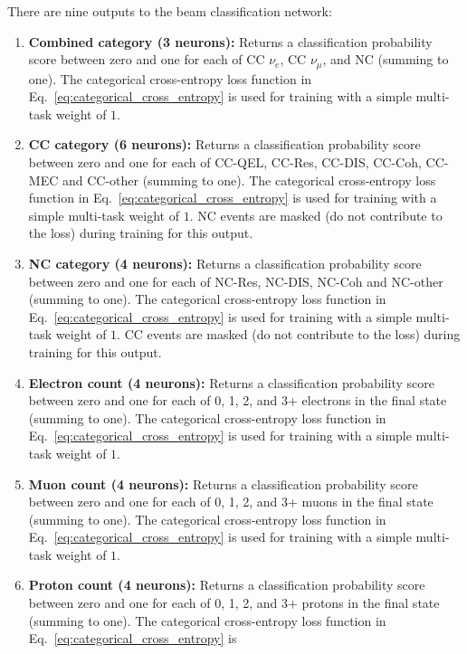 There are nine outputs to the beam classification network:
\begin{enumerate}
    \item \textbf{Combined category (3 neurons):} Returns a classification probability score
          between zero and one for each of CC $\nu_{e}$, CC $\nu_{\mu}$, and NC (summing to one).
          The categorical cross-entropy loss function in Eq.~\ref{eq:categorical_cross_entropy} is
          used for training with a simple multi-task weight of $1$.
    \item \textbf{CC category (6 neurons):} Returns a classification probability score between
          zero and one for each of CC-QEL, CC-Res, CC-DIS, CC-Coh, CC-MEC and CC-other (summing to
          one). The categorical cross-entropy loss function in
          Eq.~\ref{eq:categorical_cross_entropy} is used for training with a simple multi-task
          weight of $1$. NC events are masked (do not contribute to the loss) during training for
          this output.
    \item \textbf{NC category (4 neurons):} Returns a classification probability score between
          zero and one for each of NC-Res, NC-DIS, NC-Coh and NC-other (summing to one). The
          categorical cross-entropy loss function in Eq.~\ref{eq:categorical_cross_entropy} is
          used for training with a simple multi-task weight of $1$. CC events are masked (do not
          contribute to the loss) during training for this output.
    \item \textbf{Electron count (4 neurons):} Returns a classification probability score between
          zero and one for each of 0, 1, 2, and 3+ electrons in the final state (summing to one).
          The categorical cross-entropy loss function in Eq.~\ref{eq:categorical_cross_entropy} is
          used for training with a simple multi-task weight of $1$.
    \item \textbf{Muon count (4 neurons):} Returns a classification probability score between zero
          and one for each of 0, 1, 2, and 3+ muons in the final state (summing to one). The
          categorical cross-entropy loss function in Eq.~\ref{eq:categorical_cross_entropy} is
          used for training with a simple multi-task weight of $1$.
    \item \textbf{Proton count (4 neurons):} Returns a classification probability score between
          zero and one for each of 0, 1, 2, and 3+ protons in the final state (summing to one).
          The categorical cross-entropy loss function in Eq.~\ref{eq:categorical_cross_entropy} is

\end{enumerate}
